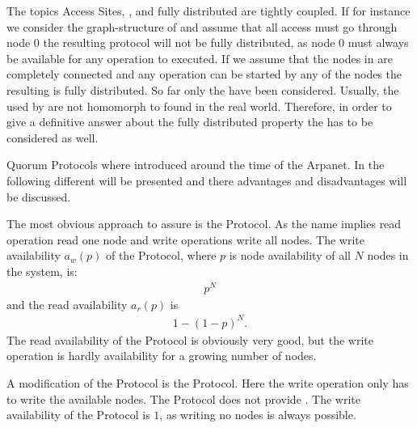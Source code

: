 \documentclass[conference]{IEEEtran}
\begin{document}
The topics Access Sites, ,  and fully distributed are tightly
coupled.
If for instance we consider the graph-structure of  and assume
that all access must go through node \(0\) the resulting protocol will not be
fully distributed, as node \(0\) must always be available for any operation to
executed.
If we assume that the nodes in  are completely connected
and any operation can be started by any of the nodes the resulting  is
fully distributed.
So far only the  have been considered.
Usually, the  used by  are not homomorph to  found in the
real world.
Therefore, in order to give a definitive answer about the fully distributed
property the  has to be considered as well.

 \label{historicaldevelopmentandcomparision}
Quorum Protocols where introduced around the time of the Arpanet.
In the following different  will be presented and there
advantages and disadvantages will be discussed.

The most obvious approach to assure  is the  Protocol.
As the name implies read operation read one node and write operations write
all nodes.
The write availability \(a_w(p)\) of the  Protocol, where \(p\) is node
availability of all \(N\) nodes in the system, is:
\begin{align}
	p^{N}
\end{align}
and the read availability \(a_r(p)\) is
\begin{align}
	1 - (1 - p)^{N}.
\end{align}
The read availability of the  Protocol is obviously very good, but the write
operation is hardly availability for a growing number of nodes.

A modification of the  Protocol is the  Protocol.
Here the write operation only has to write the available nodes.
The  Protocol does not provide .
The write availability of the  Protocol is \(1\), as writing no nodes
is always possible.
\end{document}
